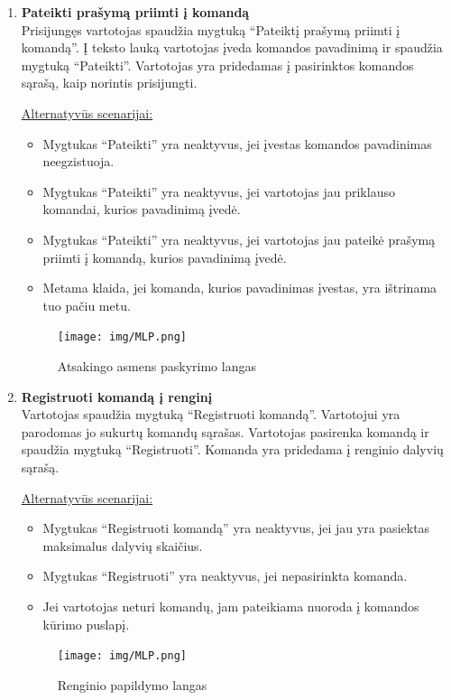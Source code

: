 \documentclass{VUMIFPSkursinis}
\begin{document}
\begin{enumerate} [label = \textbf{U\arabic*.}]
			\item \textbf{Pateikti prašymą priimti į komandą} \\
				Prisijungęs vartotojas spaudžia mygtuką “Pateiktį prašymą priimti į komandą”. Į teksto lauką vartotojas įveda komandos pavadinimą ir spaudžia mygtuką “Pateikti”. Vartotojas yra pridedamas į pasirinktos komandos sąrašą, kaip norintis prisijungti.
				
				\underline{Alternatyvūs scenarijai:}
				\begin{itemize}
					\item Mygtukas “Pateikti” yra neaktyvus, jei įvestas komandos pavadinimas neegzistuoja.
					\item Mygtukas “Pateikti” yra neaktyvus, jei vartotojas jau priklauso komandai, kurios pavadinimą įvedė.
					\item Mygtukas “Pateikti” yra neaktyvus, jei vartotojas jau pateikė prašymą priimti į komandą, kurios pavadinimą įvedė.
					\item Metama klaida, jei komanda, kurios pavadinimas įvestas, yra ištrinama tuo pačiu metu.
				\end{itemize}
				
				\begin{figure}[H]
					\centering
					\texttt{[image: img/MLP.png]}
					\caption{Atsakingo asmens paskyrimo langas}
					\label{fig:paskirti-atsakinga-asmeni}
				\end{figure}
				
			\item \textbf{Registruoti komandą į renginį} \\
				Vartotojas spaudžia mygtuką “Registruoti komandą”. Vartotojui yra parodomas jo sukurtų komandų sąrašas. Vartotojas pasirenka komandą ir spaudžia mygtuką “Registruoti”. Komanda yra pridedama į renginio dalyvių sąrašą.
				
				\underline{Alternatyvūs scenarijai:}
				\begin{itemize}
					\item Mygtukas “Registruoti komandą” yra neaktyvus, jei jau yra pasiektas maksimalus dalyvių skaičius.
					\item Mygtukas “Registruoti” yra neaktyvus, jei nepasirinkta komanda.
					\item Jei vartotojas neturi komandų, jam pateikiama nuoroda į komandos kūrimo puslapį.
				\end{itemize}
				
				\begin{figure}[H]
					\centering
					\texttt{[image: img/MLP.png]}
					\caption{Renginio papildymo langas}
					\label{fig:prideti-aprasa}
				\end{figure}
				

\end{enumerate}
\end{document}
